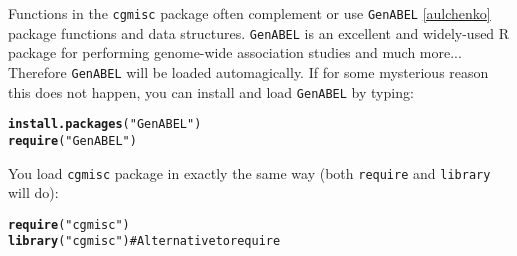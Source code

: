 \documentclass{article}\usepackage{graphicx, color}
\makeatletter
\newcommand{\hlfunctioncall}[1]{\textcolor[rgb]{0.501960784313725,0,0.329411764705882}{\textbf{#1}}}%
\newcommand{\hlstring}[1]{\textcolor[rgb]{0.6,0.6,1}{#1}}%
\newenvironment{kframe}{%
 \def\at@end@of@kframe{}%
 \ifinner\ifhmode%
  \def\at@end@of@kframe{\end{minipage}}%
  \begin{minipage}{\columnwidth}%
 \fi\fi%
 \def\FrameCommand##1{\hskip\@totalleftmargin \hskip-\fboxsep
 \colorbox{shadecolor}{##1}\hskip-\fboxsep
     \hskip-\linewidth \hskip-\@totalleftmargin \hskip\columnwidth}%
 \MakeFramed {\advance\hsize-\width
   \@totalleftmargin\z@ \linewidth\hsize
   \@setminipage}}%
 {\par\unskip\endMakeFramed%
 \at@end@of@kframe}
\newenvironment{knitrout}{}{} %
\makeatother
\begin{document}
\noindent Functions in the {\tt cgmisc} package often complement or use {\tt GenABEL} \ref{aulchenko} package functions and data structures. {\tt GenABEL} is an excellent and widely-used R package for performing genome-wide association studies and much more... Therefore {\tt GenABEL} will be loaded automagically. If for some mysterious reason this does not happen, you can install and load {\tt GenABEL} by typing:
\begin{knitrout}
\color{fgcolor}\begin{kframe}
\begin{alltt}
\hlfunctioncall{install.packages}(\hlstring{"GenABEL"})
\hlfunctioncall{require}(\hlstring{"GenABEL"})
\end{alltt}
\end{kframe}
\end{knitrout}

\noindent You load {\tt cgmisc} package in exactly the same way (both {\tt require} and {\tt library} will do):
\begin{knitrout}
\color{fgcolor}\begin{kframe}
\begin{alltt}
\hlfunctioncall{require}(\hlstring{"cgmisc"})
\hlfunctioncall{library}(\hlstring{"cgmisc"})  # Alternative to require
\end{alltt}
\end{kframe}
\end{knitrout}
\end{document}
